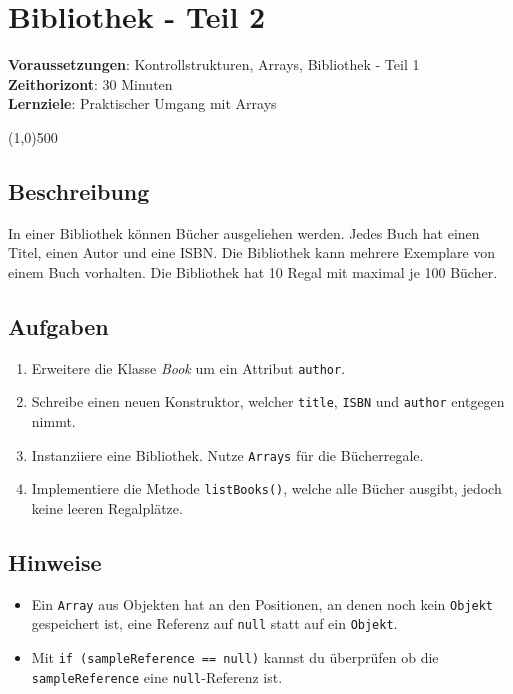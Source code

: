 

\chapter*{Bibliothek - Teil 2}

\headingfont
\parbox {\textwidth}{
    \textbf{Voraussetzungen}: Kontrollstrukturen, Arrays, Bibliothek - Teil 1 \\
    \textbf{Zeithorizont}: 30 Minuten \\
    \textbf{Lernziele}: Praktischer Umgang mit Arrays
}

\normalfont
\begin{center}
\line(1,0){500}
\end{center}
\vspace{1cm}

\section*{Beschreibung}
In einer Bibliothek können Bücher ausgeliehen werden. Jedes Buch hat einen Titel, einen Autor und eine ISBN. Die Bibliothek kann mehrere Exemplare von einem Buch vorhalten. Die Bibliothek hat 10 Regal mit maximal je 100 Bücher.

\section*{Aufgaben}
\begin{enumerate}
    \item Erweitere die Klasse \textit{Book} um ein Attribut \texttt{author}.
    \item Schreibe einen neuen Konstruktor, welcher \texttt{title}, \texttt{ISBN} und \texttt{author} entgegen nimmt.
    \item Instanziiere eine Bibliothek. Nutze \texttt{Arrays} für die Bücherregale.
    \item Implementiere die Methode \texttt{listBooks()}, welche alle Bücher ausgibt, jedoch keine leeren Regalplätze.
\end{enumerate}

\section*{Hinweise}
\begin{itemize}
    \item Ein \texttt{Array} aus Objekten hat an den Positionen, an denen noch kein \texttt{Objekt} gespeichert ist, eine Referenz auf \texttt{null} statt auf ein \texttt{Objekt}.
    \item Mit \texttt{if (sampleReference == null)} kannst du überprüfen ob die  \texttt{sampleReference} eine  \texttt{null}-Referenz ist.
\end{itemize}

